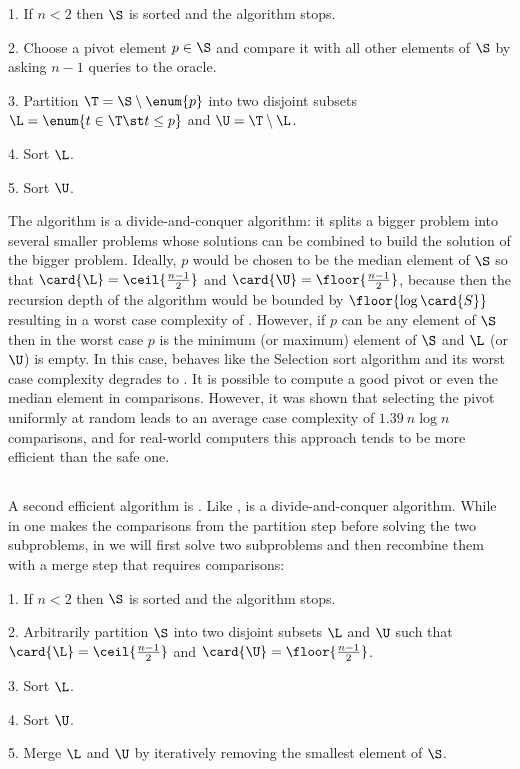 \begin{algorithm}
\item[1.] If \(n < 2\) then \(\S\) is sorted and the algorithm stops.
\item[2.] Choose a pivot element \(p \in \S\) and compare it with all other
elements of \(\S\) by asking \(n - 1\) queries to the oracle.
\item[3.] Partition \(\T = \S \setminus \enum{p}\) into two disjoint subsets
\(\L = \enum{t \in \T \st t \le p}\) and \(\U = \T \setminus \L\).
\item[4.] Sort \(\L\).
\item[5.] Sort \(\U\).
\end{algorithm}

The \quicksort algorithm is a divide-and-conquer algorithm: it splits a
bigger problem into several smaller problems whose solutions can be combined
to build the solution of the bigger problem. Ideally, \(p\) would be chosen to
be the median element of \(\S\) so that \(\card{\L} =
\ceil{\frac{n-1}{2}}\) and \(\card{\U} =
\floor{\frac{n-1}{2}}\), because then the recursion depth of the
algorithm would be bounded by \(\floor{\log \card{S}}\) resulting in a worst
case complexity of . However, if \(p\) can be any element of
\(\S\) then in the worst case \(p\) is the minimum (or maximum) element of
\(\S\) and \(\L\) (or \(\U\)) is empty. In this case, \quicksort behaves like
the Selection sort algorithm and its worst case complexity degrades to
. It is possible \cite{blum:1973} to compute a good pivot or even the
median element in  comparisons. However, it was shown \cite{hoare:1962} that
selecting the pivot uniformly at random leads to an average case complexity of
\(1.39~n \log n\) comparisons, and for real-world computers this approach tends
to be more efficient than the safe one.

\subsection*{\mergesort}

A second efficient algorithm is \mergesort
\cite{goldstine:1948,leiserson:2001}. Like \quicksort, \mergesort is a
divide-and-conquer algorithm. While in \quicksort one makes the comparisons from
the partition step before solving the two subproblems, in \mergesort we will
first solve two subproblems and then recombine them with a merge step that
requires  comparisons:

\begin{algorithm}
\item[1.] If \(n < 2\) then \(\S\) is sorted and the algorithm stops.
\item[2.] Arbitrarily partition \(\S\) into two disjoint subsets \(\L\) and
\(\U\) such that \(\card{\L} = \ceil{\frac{n-1}{2}}\) and \(\card{\U} =
\floor{\frac{n-1}{2}}\).
\item[3.] Sort \(\L\).
\item[4.] Sort \(\U\).
\item[5.] Merge \(\L\) and \(\U\) by iteratively removing the smallest element
of \(\S\).
\end{algorithm}

